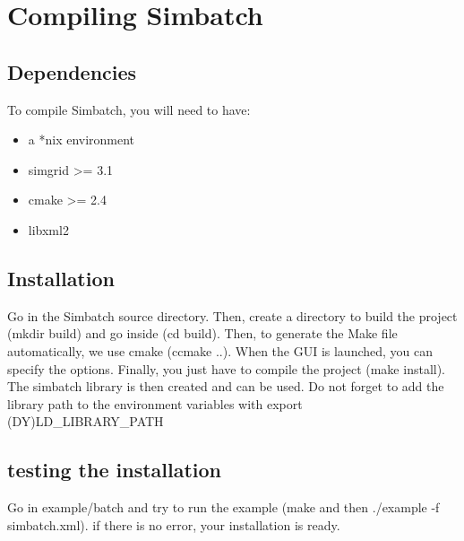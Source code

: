\section{Compiling Simbatch}

\subsection{Dependencies}

To compile Simbatch, you will need to have:

\begin{itemize}
  \item a *nix environment
  \item simgrid >= 3.1
  \item cmake >= 2.4
  \item libxml2
\end{itemize}

\subsection{Installation}

Go in the Simbatch source directory. Then, create a directory to build
the project (mkdir build) and go inside (cd build). Then, to generate
the Make file automatically, we use cmake (ccmake ..). When the GUI is
launched, you can specify the options. Finally, you just have to
compile the project (make install). The simbatch library is then
created and can be used. Do not forget to add the library path to the
environment variables with export (DY)LD\_LIBRARY\_PATH

\subsection {testing the installation}

Go in example/batch and try to run the example (make and then
./example -f simbatch.xml). if there is no error, your installation is
ready.
